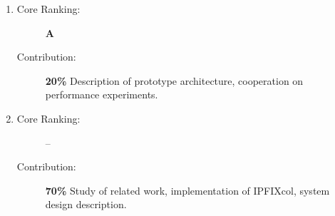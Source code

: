 \begin{enumerate}
  \item {}
  \begin{description}
    \item[Core Ranking:] \textbf{A}
    \item[Contribution:] \textbf{20\%} Description of prototype architecture, cooperation on performance experiments.
  \end{description}
  
  \item {}
  \begin{description}
    \item[Core Ranking:] --
    \item[Contribution:] \textbf{70\%} Study of related work, implementation of IPFIXcol, system design description.
  \end{description}

\end{enumerate}


